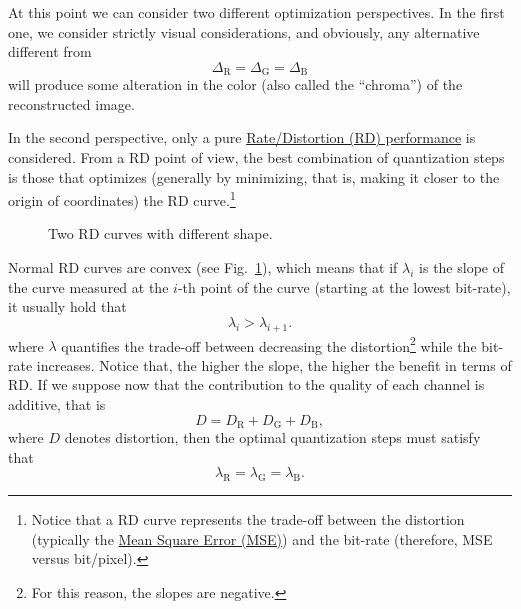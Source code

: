 At this point we can consider two different optimization
perspectives. In the first one, we consider strictly visual
considerations, and obviously, any alternative different from
\begin{equation}
  \Delta_{\text{R}} = \Delta_{\text{G}} = \Delta_{\text{B}}
  \label{eq:simple_Q}
\end{equation}
will produce some alteration in the color (also called the
``chroma'') of the reconstructed image.

In the second perspective, only a pure
\href{https://en.wikipedia.org/wiki/Rate-distortion_theory}{Rate/Distortion
  (RD) performance} is considered. From a RD point of view, the best
combination of quantization steps is those that optimizes (generally
by minimizing, that is, making it closer to the origin of coordinates)
the RD curve.\footnote{Notice that a RD curve represents the trade-off
between the distortion (typically the
\href{https://en.wikipedia.org/wiki/Root-mean-square_deviation}{Mean Square Error (MSE)}) and the bit-rate (therefore, MSE versus
bit/pixel).}

\begin{figure}
  \centering
  \caption{Two RD curves with different shape.}
  \label{fig:RD_slopes}
\end{figure}

Normal RD curves are convex (see Fig.~\ref{fig:RD_slopes}), which
means that if $\lambda_i$ is the slope of the curve measured at the
$i$-th point of the curve (starting at the lowest bit-rate), it
usually hold that
\begin{equation}
  \lambda_i > \lambda_{i+1}.
\end{equation}
where $\lambda$ quantifies the trade-off between decreasing the
distortion\footnote{For this reason, the slopes are negative.} while
the bit-rate increases. Notice that, the higher the slope, the higher
the benefit in terms of RD. If we suppose now that the contribution to
the quality of each channel is additive, that is
\begin{equation}
  D = D_{\text{R}} + D_{\text{G}} + D_{\text{B}},
  \label{eq:additive}
\end{equation}
where $D$ denotes distortion, then the optimal quantization steps must
satisfy that~\cite{vetterli1995wavelets,sayood2017introduction}
\begin{equation}
  \lambda_{\text{R}} = \lambda_{\text{G}} = \lambda_{\text{B}}.
  \label{eq:optimal_quantization}
\end{equation}

